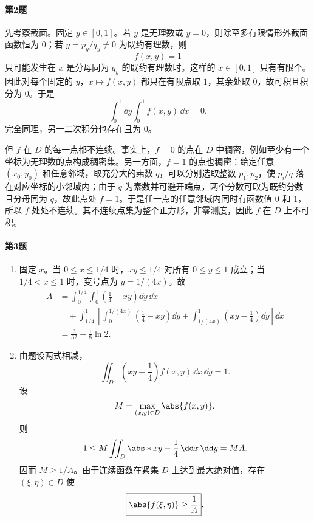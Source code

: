 \paragraph{第2题}
\begin{xsolution}
先考察截面。固定 $y\in[0,1]$。若 $y$ 是无理数或 $y=0$，则除至多有限情形外截面函数恒为 $0$；若 $y=p_y/q_y\ne0$ 为既约有理数，则
\[
  f(x,y)=1
\]
只可能发生在 $x$ 是分母同为 $q_y$ 的既约有理数时。这样的 $x\in[0,1]$ 只有有限个。因此对每个固定的 $y$，$x\mapsto f(x,y)$ 都只在有限点取 $1$，其余处取 $0$，故可积且积分为 $0$。于是
\[
  \int_0^1\dd y\int_0^1f(x,y)\,\dd x=0.
\]
完全同理，另一二次积分也存在且为 $0$。

但 $f$ 在 $D$ 的每一点都不连续。事实上，$f=0$ 的点在 $D$ 中稠密，例如至少有一个坐标为无理数的点构成稠密集。另一方面，$f=1$ 的点也稠密：给定任意 $(x_0,y_0)$ 和任意邻域，取充分大的素数 $q$，可以分别选取整数 $p_1,p_2$，使 $p_i/q$ 落在对应坐标的小邻域内；由于 $q$ 为素数并可避开端点，两个分数可取为既约分数且分母同为 $q$，故此点处 $f=1$。于是任一点的任意邻域内同时有函数值 $0$ 和 $1$，所以 $f$ 处处不连续。其不连续点集为整个正方形，非零测度，因此 $f$ 在 $D$ 上不可积。
\end{xsolution}

\paragraph{第3题}
\begin{xsolution}
\begin{enumerate}[label=(\arabic*)]
  \item 固定 $x$。当 $0\le x\le1/4$ 时，$xy\le1/4$ 对所有 $0\le y\le1$ 成立；当 $1/4<x\le1$ 时，变号点为 $y=1/(4x)$。故
  \begin{align*}
    A&=\int_0^{1/4}\int_0^1\left(\frac14-xy\right)\dd y\,\dd x\\
     &\quad+\int_{1/4}^1\left[
      \int_0^{1/(4x)}\left(\frac14-xy\right)\dd y
      +\int_{1/(4x)}^1\left(xy-\frac14\right)\dd y
    \right]\dd x\\
    &=\boxed{\frac3{32}+\frac18\ln2}.
  \end{align*}

  \item 由题设两式相减，
  \[
    \iint_D\left(xy-\frac14\right)f(x,y)\,\dd x\,\dd y=1.
  \]
  设
  \[
    M=\max_{(x,y)\in D}\abs{f(x,y)}.
  \]
  则
  \[
    1\le M\iint_D\abs*{xy-\frac14}\,\dd x\,\dd y=MA.
  \]
  因而 $M\ge1/A$。由于连续函数在紧集 $D$ 上达到最大绝对值，存在 $(\xi,\eta)\in D$ 使
  \[
    \boxed{\abs{f(\xi,\eta)}\ge\frac1A}.
  \]
\end{enumerate}
\end{xsolution}


